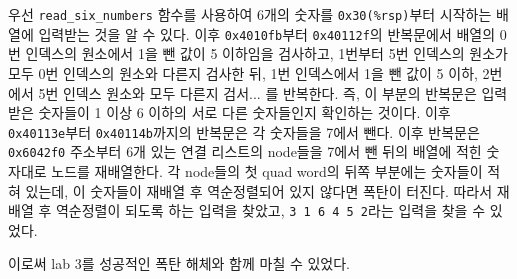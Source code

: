 \documentclass{scrartcl}
\begin{document}
우선 \texttt{read\_six\_numbers} 함수를 사용하여 6개의 숫자를
\texttt{0x30(\%rsp)}부터 시작하는 배열에 입력받는 것을 알 수 있다. 이후
\texttt{0x4010fb}부터 \texttt{0x40112f}의 반복문에서 배열의 0번 인덱스의
원소에서 1을 뺀 값이 5 이하임을 검사하고, 1번부터 5번 인덱스의 원소가 모두 0번
인덱스의 원소와 다른지 검사한 뒤, 1번 인덱스에서 1을 뺀 값이 5 이하, 2번에서
5번 인덱스 원소와 모두 다른지 검서... 를 반복한다. 즉, 이 부분의 반복문은
입력받은 숫자들이 1 이상 6 이하의 서로 다른 숫자들인지 확인하는 것이다. 이후
\texttt{0x40113e}부터 \texttt{0x40114b}까지의 반복문은 각 숫자들을 7에서 뺀다.
이후 반복문은 \texttt{0x6042f0} 주소부터 6개 있는 연결 리스트의 node들을 7에서
뺀 뒤의 배열에 적힌 숫자대로 노드를 재배열한다. 각 node들의 첫 quad word의 뒤쪽
부분에는 숫자들이 적혀 있는데, 이 숫자들이 재배열 후 역순정렬되어 있지 않다면
폭탄이 터진다. 따라서 재배열 후 역순정렬이 되도록 하는 입력을 찾았고, \texttt{3
1 6 4 5 2}라는 입력을 찾을 수 있었다.

이로써 lab 3를 성공적인 폭탄 해체와 함께 마칠 수 있었다.

\newpage

\

\newpage
\end{document}
